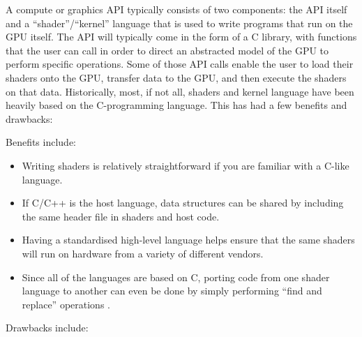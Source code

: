\documentclass[a4paper,12pt,twoside,openright]{report}
\begin{document}

A compute or graphics API typically consists of two components: the API itself
and a ``shader''/``kernel'' language that is used to write programs that run on
the GPU itself. The API will typically come in the form of a C library, with
functions that the user can call in order to direct an abstracted model of the
GPU to perform specific operations. Some of those API calls enable the user to
load their shaders onto the GPU, transfer data to the GPU, and then execute the
shaders on that data. Historically, most, if not all, shaders and kernel
language have been heavily based on the C-programming language. This has had a
few benefits and drawbacks:

Benefits include:

\begin{itemize}

    \item Writing shaders is relatively straightforward if you are familiar with
    a C-like language.

    \item If C/C++ is the host language, data structures can be shared by
    including the same header file in shaders and host code.

    \item Having a standardised high-level language helps ensure that the same
    shaders will run on hardware from a variety of different vendors.

    \item Since all of the languages are based on C, porting code from one
    shader language to another can even be done by simply performing ``find and
    replace'' operations \cite{PS4PortCrew}.

\end{itemize}

Drawbacks include:
\end{document}
